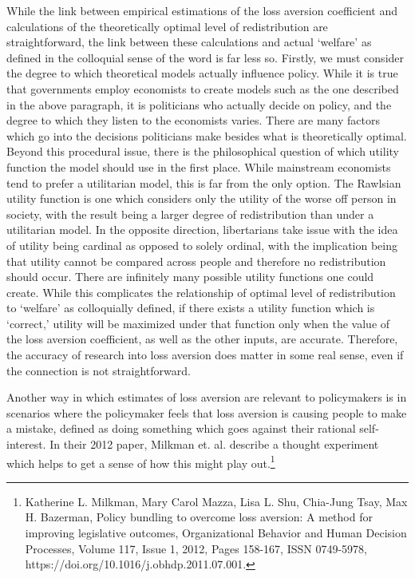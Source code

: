 \documentclass[10pt,twocolumn]{article}
\begin{document}
While the link between empirical estimations of the loss aversion coefficient and calculations of the theoretically optimal level of redistribution are straightforward, the link between these calculations and actual ‘welfare’ as defined in the colloquial sense of the word is far less so. Firstly, we must consider the degree to which theoretical models actually influence policy. While it is true that governments employ economists to create models such as the one described in the above paragraph, it is politicians who actually decide on policy, and the degree to which they listen to the economists varies. There are many factors which go into the decisions politicians make besides what is theoretically optimal. Beyond this procedural issue, there is the philosophical question of which utility function the model should use in the first place. While mainstream economists tend to prefer a utilitarian model, this is far from the only option. The Rawlsian utility function is one which considers only the utility of the worse off person in society, with the result being a larger degree of redistribution than under a utilitarian model. In the opposite direction, libertarians take issue with the idea of utility being cardinal as opposed to solely ordinal, with the implication being that utility cannot be compared across people and therefore no redistribution should occur. There are infinitely many possible utility functions one could create. While this complicates the relationship of optimal level of redistribution to ‘welfare’ as colloquially defined, if there exists a utility function which is ‘correct,’ utility will be maximized under that function only when the value of the loss aversion coefficient, as well as the other inputs, are accurate. Therefore, the accuracy of research into loss aversion does matter in some real sense, even if the connection is not straightforward. 

Another way in which estimates of loss aversion are relevant to policymakers is in scenarios where the policymaker feels that loss aversion is causing people to make a mistake, defined as doing something which goes against their rational self-interest. In their 2012 paper, Milkman et. al. describe a thought experiment which helps to get a sense of how this might play out.\footnote{Katherine L. Milkman, Mary Carol Mazza, Lisa L. Shu, Chia-Jung Tsay, Max H. Bazerman, Policy bundling to overcome loss aversion: A method for improving legislative outcomes, Organizational Behavior and Human Decision Processes, Volume 117, Issue 1, 2012, Pages 158-167, ISSN 0749-5978, https://doi.org/10.1016/j.obhdp.2011.07.001.} 
\end{document}
